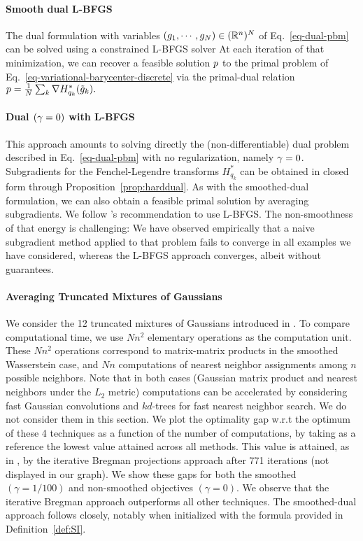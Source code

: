 \paragraph{Smooth dual L-BFGS} 
The dual formulation with variables $(g_1,\cdots,g_N)\in(\mathbb{R}^n)^N$ of Eq.~\eqref{eq-dual-pbm} can be solved using a constrained L-BFGS solver
At each iteration of that minimization, we can recover a feasible solution $p$ to the primal problem of Eq.~\eqref{eq-variational-barycenter-discrete} via the primal-dual relation
$p = \frac{1}{N}\sum_k \nabla H_{q_k}^*(\tilde g_k).$

\paragraph{Dual $(\gamma=0)$ with L-BFGS} This approach amounts to solving directly the (non-differentiable) dual problem described in Eq.~\eqref{eq-dual-pbm} with no regularization, namely $\gamma=0$. Subgradients for the Fenchel-Legendre transforms $H_{q_k}^*$ can be obtained in closed form through Proposition~\ref{prop:harddual}. As with the smoothed-dual formulation, we can also obtain a feasible primal solution by averaging subgradients. We follow \cite{Carlier-NumericsBarycenters}'s recommendation to use L-BFGS. The non-smoothness of that energy is challenging: We have observed empirically that a naive subgradient method applied to that problem fails to converge in all examples we have considered, whereas the L-BFGS approach converges, albeit without guarantees.


\paragraph{Averaging Truncated Mixtures of Gaussians}
We consider the 12 truncated mixtures of Gaussians introduced in \cite[\S3.2]{DBLP:journals/siamsc/BenamouCCNP15}. To compare computational time, we use $Nn^2$ elementary operations as the computation unit. These $Nn^2$ operations correspond to matrix-matrix products in the smoothed Wasserstein case, and $Nn$ computations of nearest neighbor assignments among $n$ possible neighbors. Note that in both cases (Gaussian matrix product and nearest neighbors under the $L_2$ metric) computations can be accelerated by considering fast Gaussian convolutions and $kd$-trees for fast nearest neighbor search. We do not consider them in this section. We plot the optimality gap w.r.t the optimum of these 4 techniques as a function of the number of computations, by taking as a reference the lowest value attained across all methods. This value is attained, as in \cite{DBLP:journals/siamsc/BenamouCCNP15}, by the iterative Bregman projections approach after 771 iterations (not displayed in our graph). We show these gaps for both the smoothed $(\gamma=1/100)$ and non-smoothed objectives $(\gamma=0)$. We observe that the iterative Bregman approach outperforms all other techniques. The smoothed-dual approach follows closely, notably when initialized with the formula provided in Definition~\ref{def:SI}.

